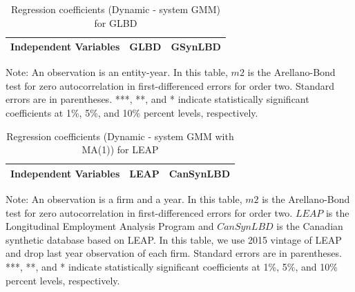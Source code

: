 \begin{table}[H]
  \centering
 \caption{Regression coefficients (Dynamic - system GMM) for GLBD} \label{Dynamic - system GMM} \medskip
\renewcommand{\arraystretch}{1}
\begin{tabular}{l|c| c}
\toprule
\textbf{Independent Variables}&\textbf{GLBD} &\textbf{GSynLBD}\\
\midrule

   \bottomrule
  \end{tabular} 
\begin{tablenotes}
\small
\item Note: An observation is an entity-year. In this table, $m2$ is the Arellano-Bond test for zero autocorrelation in first-differenced errors for order two. Standard errors are in parentheses. ***, **, and * indicate statistically significant coefficients at 1\%, 5\%, and 10\% percent levels, respectively.
 \end{tablenotes}
\end{table}









\begin{table}[H]
  \centering
\begin{threeparttable}
 \caption{Regression coefficients (Dynamic - system GMM with MA(1)) for LEAP} \label{Dynamic - system GMM with MA(1)} \medskip
\renewcommand{\arraystretch}{1}
\begin{tabular}{l|c c| c c}
\toprule
\textbf{Independent Variables}&\multicolumn{2}{c|}{\textbf{LEAP}} &  \multicolumn{2}{c}{\textbf{CanSynLBD}}\\
\midrule

   \bottomrule
  \end{tabular} 
\begin{tablenotes}
\small
\item Note: An observation is a firm and a year. In this table, $m2$ is the Arellano-Bond test for zero autocorrelation in first-differenced errors for order two. $LEAP$ is the Longitudinal Employment Analysis Program and $CanSynLBD$ is the Canadian synthetic database based on LEAP. In this table, we use 2015 vintage of LEAP and drop last year observation of each firm. Standard errors are in parentheses. ***, **, and * indicate statistically significant coefficients at 1\%, 5\%, and 10\% percent levels, respectively.
 \end{tablenotes}
 \end{threeparttable}
\end{table}

